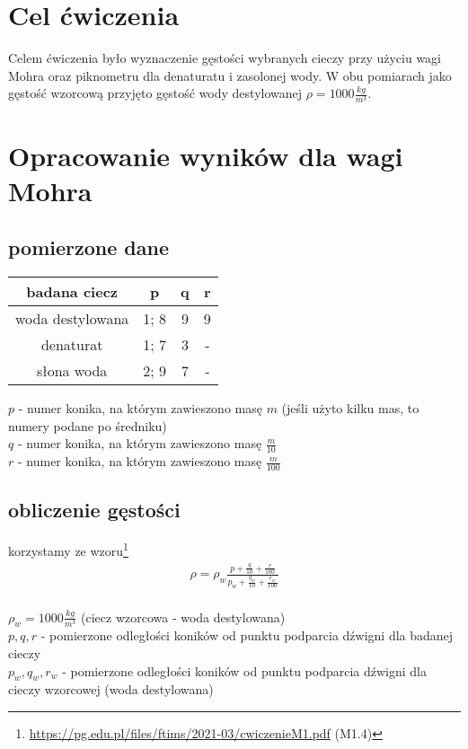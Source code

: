 \documentclass{article}
\begin{document}
\section{Cel ćwiczenia}
Celem ćwiczenia było wyznaczenie gęstości wybranych cieczy  przy użyciu wagi Mohra oraz piknometru dla denaturatu i zasolonej wody.  W obu pomiarach jako gęstość wzorcową przyjęto gęstość wody destylowanej $\rho = 1000 \frac{kg}{m^3}$.

\section{Opracowanie wyników dla wagi Mohra}
\subsection{pomierzone dane}
\begin{center}
\begin{tabular}{ c | c | c | c }
badana ciecz & p & q & r \\
\hline
 woda destylowana & 1; 8 & 9  &  9  \\ 
 denaturat  & 1; 7 & 3 & - \\  
 słona woda & 2; 9 & 7 & -    

\end{tabular}
\end{center}
$p$ - numer konika,  na którym zawieszono masę $m$ (jeśli użyto kilku mas, to numery podane po średniku)\\
$q$ - numer konika,  na którym zawieszono masę $\frac{m}{10}$ \\
$r$ - numer konika, na którym zawieszono masę $\frac{m}{100}$
\subsection{obliczenie gęstości}
korzystamy ze wzoru\footnote{\url{https://pg.edu.pl/files/ftims/2021-03/cwiczenieM1.pdf} (M1.4)}
\begin{gather*}
	\rho = \rho_w \frac{p+\frac{q}{10} + \frac{r}{100}}{p_w+\frac{q_w}{10} + \frac{r_w}{100}}
\end{gather*} 
\\ $\rho_w = 1000 \frac{kg}{m^3}$ (ciecz wzorcowa - woda destylowana)
\\ $p, q, r$ - pomierzone odległości koników od punktu podparcia dźwigni dla badanej cieczy \\
$p_w, q_w,  r_w$ - pomierzone odległości koników od punktu podparcia dźwigni dla cieczy wzorcowej (woda destylowana)
\end{document}
